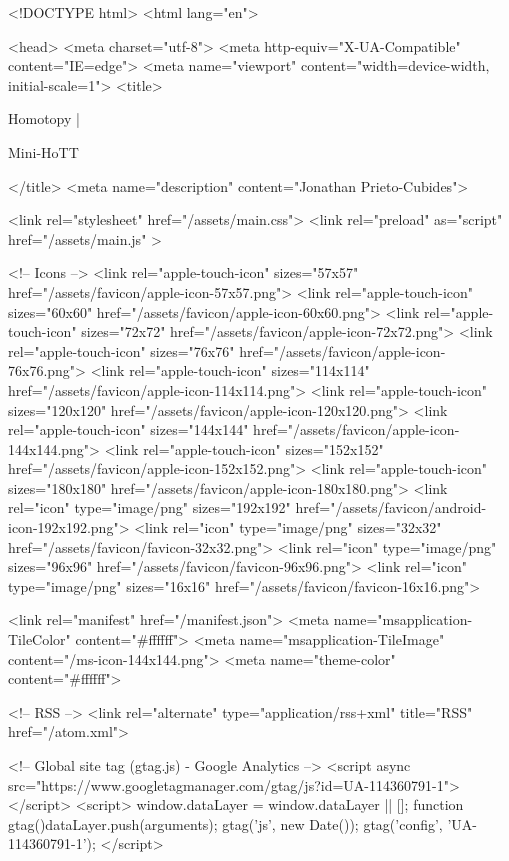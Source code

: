 <!DOCTYPE html>
<html lang="en">

<head>
  <meta charset="utf-8">
  <meta http-equiv="X-UA-Compatible" content="IE=edge">
  <meta name="viewport" content="width=device-width, initial-scale=1">
  <title>
    
      
        Homotopy |
      
        Mini-HoTT
    
  </title>
  <meta name="description" content="Jonathan Prieto-Cubides">

  <link rel="stylesheet" href="/assets/main.css">
  <link rel="preload" as="script" href="/assets/main.js" >

  <!-- Icons -->
  <link rel="apple-touch-icon" sizes="57x57" href="/assets/favicon/apple-icon-57x57.png">
  <link rel="apple-touch-icon" sizes="60x60" href="/assets/favicon/apple-icon-60x60.png">
  <link rel="apple-touch-icon" sizes="72x72" href="/assets/favicon/apple-icon-72x72.png">
  <link rel="apple-touch-icon" sizes="76x76" href="/assets/favicon/apple-icon-76x76.png">
  <link rel="apple-touch-icon" sizes="114x114" href="/assets/favicon/apple-icon-114x114.png">
  <link rel="apple-touch-icon" sizes="120x120" href="/assets/favicon/apple-icon-120x120.png">
  <link rel="apple-touch-icon" sizes="144x144" href="/assets/favicon/apple-icon-144x144.png">
  <link rel="apple-touch-icon" sizes="152x152" href="/assets/favicon/apple-icon-152x152.png">
  <link rel="apple-touch-icon" sizes="180x180" href="/assets/favicon/apple-icon-180x180.png">
  <link rel="icon" type="image/png" sizes="192x192"  href="/assets/favicon/android-icon-192x192.png">
  <link rel="icon" type="image/png" sizes="32x32" href="/assets/favicon/favicon-32x32.png">
  <link rel="icon" type="image/png" sizes="96x96" href="/assets/favicon/favicon-96x96.png">
  <link rel="icon" type="image/png" sizes="16x16" href="/assets/favicon/favicon-16x16.png">

  <link rel="manifest" href="/manifest.json">
  <meta name="msapplication-TileColor" content="#ffffff">
  <meta name="msapplication-TileImage" content="/ms-icon-144x144.png">
  <meta name="theme-color" content="#ffffff">

  <!-- RSS -->
  <link rel="alternate" type="application/rss+xml" title="RSS" href="/atom.xml">

  <!-- Global site tag (gtag.js) - Google Analytics -->
  <script async src="https://www.googletagmanager.com/gtag/js?id=UA-114360791-1"></script>
  <script>
    window.dataLayer = window.dataLayer || [];
    function gtag(){dataLayer.push(arguments);}
    gtag('js', new Date());
    gtag('config', 'UA-114360791-1');
  </script>

